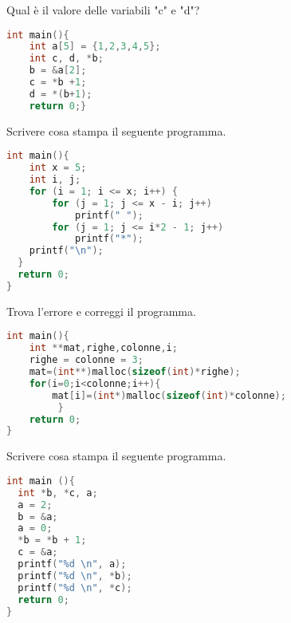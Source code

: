 \documentclass[addpoints,11pt]{exam}
\begin{document}
\begin{questions}
\question[2] Qual è il valore delle variabili "c" e "d"?

\begin{minipage}[t]{0.4\linewidth}
	\begin{lstlisting}[language=C]
int main(){
    int a[5] = {1,2,3,4,5};
    int c, d, *b;
    b = &a[2];
    c = *b +1;  
    d = *(b+1);  
    return 0;}
\end{lstlisting}
\end{minipage}
\begin{minipage}[t]{0.6\linewidth}
	\makeemptybox{140pt}
\end{minipage}



\question[3] Scrivere cosa stampa il seguente programma.

\begin{minipage}[t]{0.55\linewidth}
	\begin{lstlisting}[language=C]
int main(){
    int x = 5;
    int i, j;
    for (i = 1; i <= x; i++) {
        for (j = 1; j <= x - i; j++)
            printf(" ");
        for (j = 1; j <= i*2 - 1; j++)
            printf("*");
    printf("\n");
  }
  return 0;
}
\end{lstlisting}
\end{minipage}
\begin{minipage}[t]{0.45\linewidth}
	\makeemptybox{170pt}
\end{minipage}



\question[2] Trova l'errore e correggi il programma.

\begin{minipage}[t]{0.6\linewidth}
	\begin{lstlisting}[language=C]
int main(){
    int **mat,righe,colonne,i;
    righe = colonne = 3;
    mat=(int**)malloc(sizeof(int)*righe); 
    for(i=0;i<colonne;i++){
        mat[i]=(int*)malloc(sizeof(int)*colonne); 
         }
    return 0;
}
\end{lstlisting}
\end{minipage}
\begin{minipage}[t]{0.4\linewidth}
	\makeemptybox{150pt}
\end{minipage}








\question[1] Scrivere cosa stampa il seguente programma.

\begin{minipage}[t]{0.4\linewidth}
	\begin{lstlisting}[language=C]
int main (){
  int *b, *c, a;
  a = 2;
  b = &a;
  a = 0;
  *b = *b + 1;
  c = &a;
  printf("%d \n", a);      
  printf("%d \n", *b);     
  printf("%d \n", *c);     
  return 0;
}
\end{lstlisting}
\end{minipage}
\begin{minipage}[t]{0.6\linewidth}
	\makeemptybox{150pt}
\end{minipage}




\end{questions}
\end{document}
